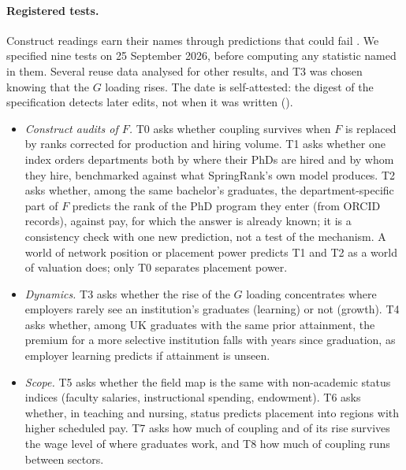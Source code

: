 \paragraph{Registered tests.} Construct readings earn their names through predictions that could fail
\citep{cronbach1955construct}. We specified nine tests on 25 September 2026, before computing any statistic named
in them. Several reuse data analysed for other results, and T3 was chosen knowing that the $G$ loading rises.
The date is self-attested: the digest of the specification detects later edits, not when it was written
(\SItheory).
\begin{itemize}
\item \emph{Construct audits of $F$.} T0 asks whether coupling survives when $F$ is replaced by ranks corrected
for production and hiring volume. T1 asks whether one index orders departments both by where their PhDs are
hired and by whom they hire, benchmarked against what SpringRank's own model produces. T2 asks whether, among
the same bachelor's graduates, the department-specific part of $F$ predicts the rank of the PhD program they
enter (from ORCID records), against pay, for which the answer is already known; it is a consistency check with one
new prediction, not a test of the mechanism. A world of network position or placement power predicts T1 and T2 as
a world of valuation does; only T0 separates placement power.
\item \emph{Dynamics.} T3 asks whether the rise of the $G$ loading concentrates where employers rarely see an
institution's graduates (learning) or not (growth). T4 asks whether, among UK graduates with the same prior
attainment, the premium for a more selective institution falls with years since graduation, as employer
learning predicts if attainment is unseen.
\item \emph{Scope.} T5 asks whether the field map is the same with non-academic status indices (faculty
salaries, instructional spending, endowment). T6 asks whether, in teaching and nursing, status predicts
placement into regions with higher scheduled pay. T7 asks how much of coupling and of its rise survives the
wage level of where graduates work, and T8 how much of coupling runs between sectors.
\end{itemize}

